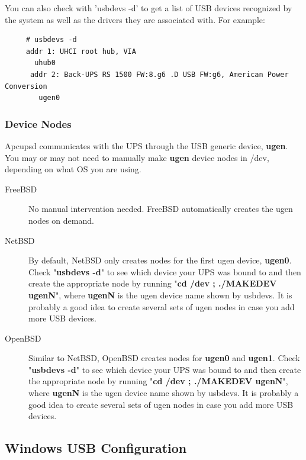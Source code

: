You can also check with 'usbdevs -d' to get a list of USB devices recognized
by the system as well as the drivers they are associated with. For example: 

\begin{verbatim}
     # usbdevs -d
     addr 1: UHCI root hub, VIA
       uhub0
      addr 2: Back-UPS RS 1500 FW:8.g6 .D USB FW:g6, American Power Conversion
        ugen0
\end{verbatim}

\subsubsection*{Device Nodes}

Apcupsd communicates with the UPS through the USB generic device, {\bf ugen}.
You may or may not need to manually make {\bf ugen} device nodes in /dev, 
depending on what OS you are using.  

\begin{description}
\item [FreeBSD]
No manual intervention needed. FreeBSD automatically creates the ugen
nodes on demand.

\item [NetBSD]
By default, NetBSD only creates nodes for the first ugen device, {\bf ugen0}.
Check "{\bf usbdevs -d}" to see which device your UPS was bound to and then
create the appropriate node by running "{\bf cd /dev ; ./MAKEDEV ugenN}",
where {\bf ugenN} is the ugen device name shown by usbdevs. It is probably
a good idea to create several sets of ugen nodes in case you add more USB
devices.

\item [OpenBSD]
Similar to NetBSD, OpenBSD creates nodes for {\bf ugen0} and {\bf ugen1}.
Check "{\bf usbdevs -d}" to see which device your UPS was bound to and then
create the appropriate node by running "{\bf cd /dev ; ./MAKEDEV ugenN}",
where {\bf ugenN} is the ugen device name shown by usbdevs. It is probably
a good idea to create several sets of ugen nodes in case you add more USB
devices.
\end{description}


\subsection*{Windows USB Configuration}


